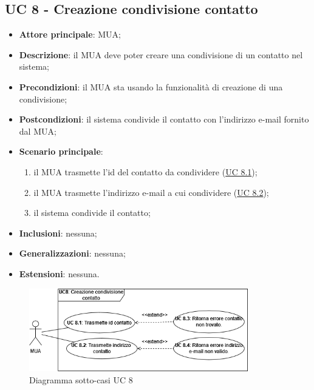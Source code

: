 \subsection{UC 8 - Creazione condivisione contatto} \label{sec:UC8}

    \begin{itemize}
        \item \textbf{Attore principale}: MUA;
        \item \textbf{Descrizione}: il MUA deve poter creare una condivisione di un contatto nel sistema;
        \item \textbf{Precondizioni}: il MUA sta usando la funzionalità di creazione di una condivisione;
        \item \textbf{Postcondizioni}: il sistema condivide il contatto con l'indirizzo e-mail fornito dal MUA;
        \item \textbf{Scenario principale}:
            \begin{enumerate}
                \item il MUA trasmette l'id del contatto da condividere (\hyperref[sec:UC8.1]{UC 8.1});
                \item il MUA trasmette l'indirizzo e-mail a cui condividere (\hyperref[sec:UC8.2]{UC 8.2});
                \item il sistema condivide il contatto;
            \end{enumerate}
        \item \textbf{Inclusioni}: nessuna;
        \item \textbf{Generalizzazioni}: nessuna;
        \item \textbf{Estensioni}: nessuna.
    \end{itemize}


    \begin{figure}[H]
        \includegraphics[width=0.85\textwidth]{sections/uc_imgs/UC08.png}
        \centering
        \caption{Diagramma sotto-casi UC 8}
    \end{figure}

